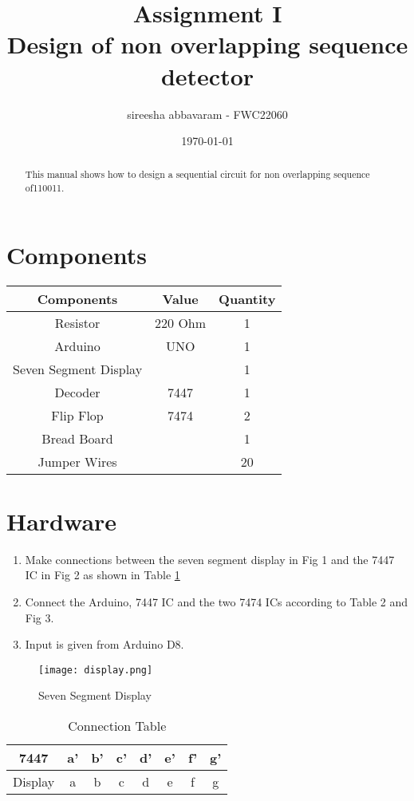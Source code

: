 \documentclass[journal,12pt,twocolumn]{IEEEtran}
\title{Assignment \textrm{I}
\textbf{\\Design of  non overlapping sequence detector}}
\author{sireesha abbavaram - FWC22060}
\date{\today}
\begin{document}
\maketitle

\tableofcontents 
\vspace{0.5cm}

\begin{abstract}
This manual shows how to design a sequential circuit for non overlapping sequence of110011.
\end{abstract}

\section{Components}
\begin{tabular}{|c|c|c|}
\hline
Components & Value & Quantity\\
\hline
Resistor & 220 Ohm & 1\\
\hline
Arduino & UNO & 1\\
\hline
Seven Segment Display & & 1\\
\hline
Decoder & 7447 & 1\\
\hline
Flip Flop & 7474 & 2\\
\hline
Bread Board & & 1\\
\hline
Jumper Wires & & 20\\
\hline
\end{tabular}

\section{Hardware}
\begin{enumerate}
\item Make connections between the seven segment display in Fig 1 and the 7447 IC in Fig 2 as shown in Table \ref{table:1}
\item Connect the Arduino, 7447 IC and the two 7474 ICs according to Table 2 and Fig 3.
\item Input is given from Arduino D8.
\vspace{0.5cm}
\end{enumerate} 

\begin{figure}[h!]
\centering
\texttt{[image: display.png]}
\centering
\caption{Seven Segment Display}
\end{figure}


\begin{table}[h]
\Large
\centering
\begin{tabular}{|c|c|c|c|c|c|c|c|}
\hline
7447 & a' & b' & c' & d' & e' & f' & g'\\
\hline
Display & a & b & c & d & e & f & g\\
\hline
\end{tabular}
\caption{Connection Table}
\label{table:1}
\end{table}
\end{document}
